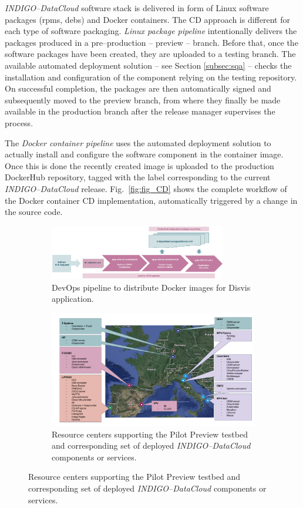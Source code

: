 \documentclass[journal]{IEEEtran}
\begin{document}
{\sl INDIGO--DataCloud} software stack is delivered in form of Linux software packages (rpms, debs)
and Docker containers. The CD approach is different for each type of software packaging. \textit{Linux
package pipeline} intentionally delivers the packages produced in a pre--production -- preview --
branch. Before that, once the software packages have been created, they are uploaded to a
testing branch. The available automated deployment solution -- see Section \ref{subsec:sqa} -- checks
the installation and configuration of the component relying on the testing repository. On
successful completion, the packages are then automatically signed and subsequently moved to
the preview branch, from where they finally be made available in the production branch after
the release manager supervises the process.

The \textit{Docker container pipeline} uses the automated deployment solution to
actually install and configure the software component in the container image. Once this is
done the recently created image is uploaded to the production DockerHub repository, tagged
with the label corresponding to the current {\sl INDIGO--DataCloud} release.
Fig.~\ref{fig:fig_CD} shows the complete workflow of the Docker container CD implementation,
automatically triggered by a change in the source code.

\begin{figure}
	\centering
	\begin{subfigure}
		\centering
\includegraphics[width=0.85\textwidth]{images/disvis-flow.png}
\caption{DevOps pipeline to distribute Docker images for Disvis application.}
\label{fig:fig_disvis}
	\end{subfigure}
	\quad
	\begin{subfigure}
		\centering
\includegraphics[width=\textwidth]{images/pilotpreview.png}
\caption{Resource centers supporting the Pilot Preview testbed and corresponding
set of deployed {\sl INDIGO--DataCloud} components or services.}
\label{fig:fig_pilotpreview}
	\end{subfigure}
\end{figure}
\end{document}
